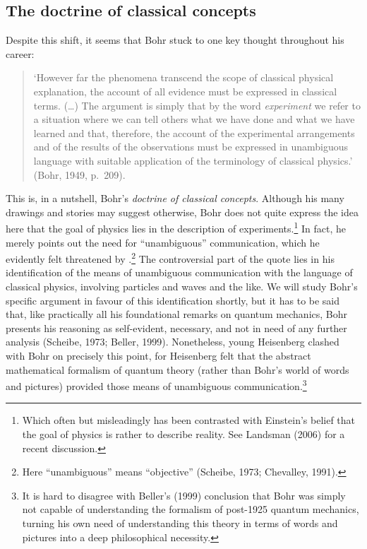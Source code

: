\documentclass[12pt]{article}
\begin{document}
\subsection{The doctrine of classical concepts}\label{Pcl}
Despite this shift, it seems that Bohr stuck to one key thought throughout his  career:
\begin{quote}
 `However far the phenomena transcend the scope of classical physical explanation, the account of all evidence must be expressed in classical terms. (\ldots) The argument is simply that by the word {\it experiment} we refer to a situation where we can tell others what we have done and what we have learned and that, therefore, the account of the experimental arrangements and of the results of the observations must be expressed in unambiguous language with suitable application of the terminology of classical physics.' (Bohr, 1949, p.\ 209).
\end{quote}

This is, in a nutshell, Bohr's {\it doctrine of classical concepts}. 
Although his many drawings and stories may suggest otherwise, Bohr does not quite express the idea here that the goal of physics lies in the description of experiments.\footnote{Which often but misleadingly has been contrasted with
Einstein's  belief that the  goal of physics is rather to describe reality.
See Landsman (2006) for a recent discussion. } In fact, he merely points out the need for ``unambiguous''  communication, which he evidently felt threatened by  \qm.\footnote{Here  ``unambiguous'' means ``objective'' (Scheibe, 1973; Chevalley, 1991).}
The controversial part of the quote lies in his identification of the means of unambiguous communication with the language of classical physics, involving particles and waves and the like. We will study Bohr's specific argument in favour of this identification shortly, but it has to be said that, like practically all his foundational remarks on quantum mechanics, Bohr presents his reasoning as self-evident, necessary, and not in need of any further analysis (Scheibe, 1973; Beller, 1999).  Nonetheless, young Heisenberg clashed with Bohr on precisely this point, for  Heisenberg felt that the abstract mathematical formalism of quantum theory (rather than Bohr's world of words and pictures) provided those means of unambiguous communication.\footnote{It is hard to disagree with Beller's (1999) conclusion that Bohr was simply not capable of understanding the formalism of post-1925 quantum mechanics, turning his own  need of understanding this theory in terms of words and pictures into a deep philosophical necessity.}
\end{document}
